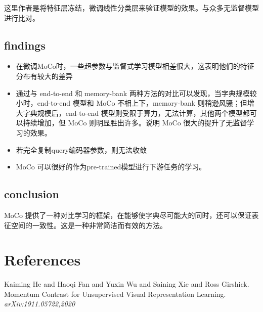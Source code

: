 这里作者是将特征层冻结，微调线性分类层来验证模型的效果。与众多无监督模型进行比对。

\subsection{findings}

\begin{itemize}
	\item 在微调MoCo时，一些超参数与监督式学习模型相差很大，这表明他们的特征分布有较大的差异
	\item 通过与 end-to-end 和 memory-bank 两种方法的对比可以发现，当字典规模较小时，end-to-end 模型和 MoCo 不相上下，memory-bank 则稍逊风骚；但增大字典规模后，end-to-end 模型则受限于算力，无法计算，其他两个模型都可以持续增加，但 MoCo 则明显胜出许多。说明 MoCo 很大的提升了无监督学习的效果。
	\item 若完全复制query编码器参数，则无法收敛
	\item MoCo 可以很好的作为pre-trained模型进行下游任务的学习。
\end{itemize}

\subsection{conclusion}

MoCo 提供了一种对比学习的框架，在能够使字典尽可能大的同时，还可以保证表征空间的一致性。这是一种非常简洁而有效的方法。

\section{References}

Kaiming He and Haoqi Fan and Yuxin Wu and Saining Xie and Ross Girshick. Momentum Contrast for Unsupervised Visual Representation Learning. \textit{arXiv:1911.05722,2020}

          
